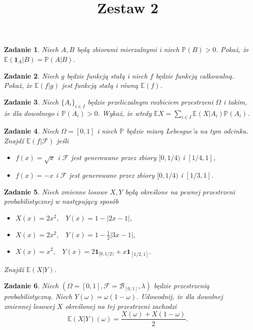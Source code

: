 \documentclass{mwart}
\title{Zestaw 2}
\newtheorem{zd}{Zadanie}
\begin{document}

\maketitle

\begin{zd}
Niech $A, B$ będą zbiorami mierzalnymi i niech $\mathbb{P}(B)>0$. Pokaż, że $\mathbb{E}(\pmb{1}_A|B)= \mathbb{P}(A|B)$.
\end{zd}

\begin{zd}
Niech $g$ będzie funkcją stałą i niech $f$ będzie funkcją całkowalną. Pokaż, że $\mathbb{E}(f|g)$ jest funkcją stałą i równą $\mathbb{E}(f)$.
\end{zd}

\begin{zd}
Niech $\{A_i\}_{i \in I}$ będzie przeliczalnym rozbiciem przestrzeni $\Omega$ i takim, że dla dowolnego $i$ $\mathbb{P}(A_i) > 0$. Wykaż, że wtedy $\mathbb{E}X = \sum_{i\in I}\mathbb{E}(X|A_i)\mathbb{P}(A_i)$.
\end{zd}

\begin{zd}
Niech $\Omega = [0, 1]$ i niech $\mathbb{P}$ będzie miarą Lebesgue'a na tym odcinku. Znajdź $\mathbb{E}(f|\mathcal{F})$ jeśli
\begin{itemize}
\item $f(x) = \sqrt{x}$ i $\mathcal{F}$ jest generowane przez zbiory $[0, 1/4)$ i $[1/4, 1]$,
\item $f(x) = -x$ i $\mathcal{F}$ jest generowane przez zbiory $[0, 1/4)$ i $[1/3, 1]$.
\end{itemize}
\end{zd}

\begin{zd}
	Niech zmienne losowe $X,Y$ będą określone na pewnej przestrzeni probabilistycznej w następujący sposób
	\begin{itemize}
	\item $X(x) = 2x^2,\ \ \ \ Y(x) = 1 - |2x - 1|$,
	\item $X(x) = 2x^2, \ \ \ \ Y(x) = 1 - \frac{1}{2}\left|3x-1\right|$,
	\item $X(x) = x^2, \ \ \ \ Y(x) = 2\pmb{1}_{[0, 1/2)} + x\pmb{1}_{[1/2, 1]}$.
	\end{itemize}
	Znajdź $\mathbb{E}(X|Y)$.
\end{zd}

\begin{zd}
	Niech $(\Omega = [0,1], \mathcal{F} = \mathcal{B}_{[0,1]}, \lambda)$ będzie przestrzenią probabilistyczną. Niech $Y(\omega) = \omega(1-\omega)$. Udowodnij, że dla dowolnej zmiennej losowej $X$ określonej na tej przestrzeni zachodzi
	\begin{displaymath}
	 \mathbb{E}(X|Y)(\omega) = \frac{X(\omega) + X(1-\omega)}{2}.
	\end{displaymath}
\end{zd}
\end{document}

